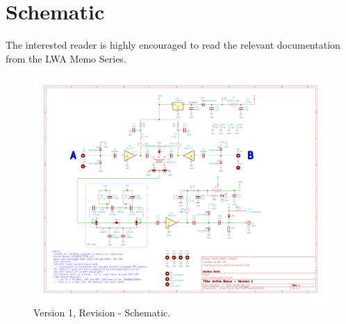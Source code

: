 \newpage
\section{Schematic}
\label{sec:schematic}

The interested reader is highly encouraged to read the relevant documentation from the LWA Memo Series.

\begin{figure}
  \centering
  \includegraphics[width=\linewidth]{figures/schematic.png}
  \caption{Version 1, Revision - Schematic.}
  \label{fig:schematic}
\end{figure}


